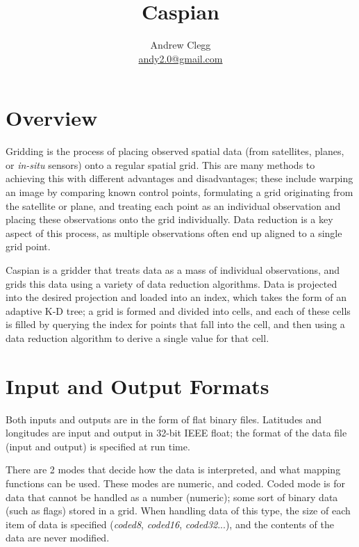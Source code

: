 \documentclass[a4paper,12pt]{article}
\title{Caspian}
\author{Andrew Clegg\\\href{mailto:andy2.0@gmail.com}{andy2.0@gmail.com}}
\begin{document}
\maketitle
{}
\tableofcontents
\section{Overview}
Gridding is the process of placing observed spatial data (from satellites, planes, or \textit{in-situ} sensors) onto a regular spatial grid. This are many methods to achieving this with different advantages and disadvantages; these include warping an image by comparing known control points, formulating a grid originating from the satellite or plane, and treating each point as an individual observation and placing these observations onto the grid individually. Data reduction is a key aspect of this process, as multiple observations often end up aligned to a single grid point.

Caspian is a gridder that treats data as a mass of individual observations, and grids this data using a variety of data reduction algorithms. Data is projected into the desired projection and loaded into an index, which takes the form of an adaptive K-D tree; a grid is formed and divided into cells, and each of these cells is filled by querying the index for points that fall into the cell, and then using a data reduction algorithm to derive a single value for that cell.

\section{Input and Output Formats}
Both inputs and outputs are in the form of flat binary files. Latitudes and longitudes are input and output in 32-bit IEEE float; the format of the data file (input and output) is specified at run time.

There are 2 modes that decide how the data is interpreted, and what mapping functions can be used. These modes are numeric, and coded. Coded mode is for data that cannot be handled as a number (numeric); some sort of binary data (such as flags) stored in a grid. When handling data of this type, the size of each item of data is specified (\textit{coded8}, \textit{coded16}, \textit{coded32}...), and the contents of the data are never modified.
\end{document}
